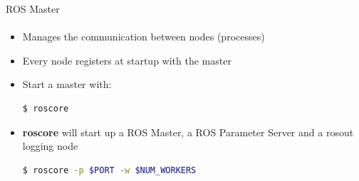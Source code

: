 \documentclass[aspectratio=169]{beamer}
\begin{document}
\begin{frame}[fragile]{ROS Master}
	\framesubtitle{ }
	\begin{minipage}{0.6\textwidth}
    \begin{itemize}
        \item Manages the communication between nodes (processes)
        \item Every node registers at startup with the master
    \end{itemize}
	
	\vspace{0.3in}

	\begin{itemize}
		\item Start a master with:

		\begin{lstlisting}[language=bash]
	$ roscore
		\end{lstlisting}

		\item \textbf{roscore} will start up a ROS Master, a ROS Parameter Server and a rosout logging node
		
		\begin{lstlisting}[language=bash]
	$ roscore -p $PORT -w $NUM_WORKERS
		\end{lstlisting}
		\end{itemize}

\end{minipage}
\begin{minipage}{0.4\textwidth}
	
\end{minipage}
\end{frame}
\end{document}
